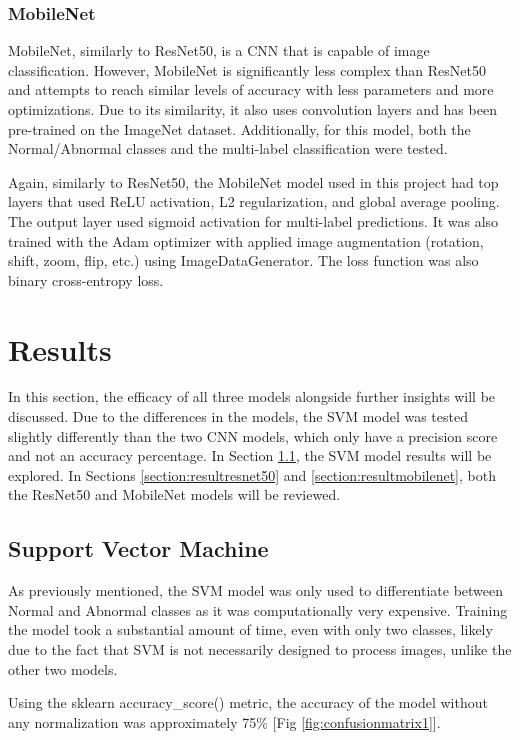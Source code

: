 \documentclass{article}
\theoremstyle{plain}
\theoremstyle{definition}
\theoremstyle{remark}
\begin{document}
\subsubsection{MobileNet}
MobileNet, similarly to ResNet50, is a CNN that is capable of image classification. However,
MobileNet is significantly less complex than ResNet50 and attempts to reach similar levels of
accuracy with less parameters and more optimizations. Due to its similarity, it also uses convolution
layers and has been pre-trained on the ImageNet dataset. Additionally, for this model, both the Normal/Abnormal
classes and the multi-label classification were tested.

Again, similarly to ResNet50, the MobileNet model used in this project had top layers that used ReLU
activation, L2 regularization, and global average pooling. The output layer used sigmoid activation
for multi-label predictions. It was also trained with the Adam optimizer with applied image
augmentation (rotation, shift, zoom, flip, etc.) using ImageDataGenerator. The loss function was also
binary cross-entropy loss.


\section{Results}
In this section, the efficacy of all three models alongside further insights will be discussed.
Due to the differences in the models, the SVM model was tested slightly differently than the two CNN
models, which only have a precision score and not an accuracy percentage.
In Section \ref{section:resultsvm}, the SVM model results will be explored. In Sections
\ref{section:resultresnet50} and \ref{section:resultmobilenet}, both the ResNet50 and MobileNet
models will be reviewed.

\subsection{Support Vector Machine}
\label{section:resultsvm}
As previously mentioned, the SVM model was only used to differentiate between Normal and Abnormal
classes as it was computationally very expensive. Training the model took a substantial amount of
time, even with only two classes, likely due to the fact that SVM is not necessarily designed to
process images, unlike the other two models.

Using the sklearn accuracy\_score() metric, the accuracy of the model without any normalization was
approximately 75\% [Fig \ref{fig:confusionmatrix1}].
\end{document}
